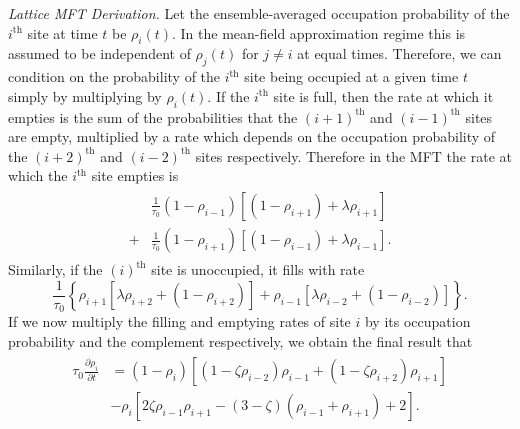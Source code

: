 \documentclass[
reprint,
 amsmath,amssymb,
 aps,
 prl,
]{revtex4-1}
\newcommand{\partDeriv}[2]{\frac{\partial #1}{\partial #2}}
\begin{document}
\textit{Lattice MFT Derivation.} Let the ensemble-averaged occupation probability of the $i^\mathrm{th}$ site at time $t$ be $\rho_i (t)$. In the mean-field approximation regime this is assumed to be independent of $\rho_j(t)$ for $j \neq i $ at
equal times. Therefore, we can condition on the probability of the $i^\mathrm{th}$ site being occupied at a given time $t$ simply by multiplying by $\rho_i (t)$.
If the $i^\mathrm{th}$ site is full, then the rate at which it empties is the sum of the probabilities that the $(i+1)^\mathrm{th}$ and $(i-1)^\mathrm{th}$ sites are empty, multiplied by a rate which depends on the occupation probability
of the $(i+2)^\mathrm{th}$ and $(i-2)^\mathrm{th}$ sites respectively. Therefore in the MFT the rate at which the $i^\mathrm{th}$ site empties is 
\begin{align}
\begin{split}
 &\frac{1}{\tau_0 } (1-\rho_{i-1})\left[ (1 - \rho_{i+1}) + \lambda \rho_{i+1} \right] \\
 +&\frac{1}{\tau_0 } (1-\rho_{i+1})\left[ (1 - \rho_{i-1}) + \lambda \rho_{i-1} \right] .
\end{split}
 \end{align}
Similarly, if the $(i)^\mathrm{th}$ site is unoccupied, it fills with rate
\begin{equation}
\frac{1}{\tau_0 } \left\{ \rho_{i+1} \left[ \lambda \rho_{i+2} + (1-\rho_{i+2}) \right] + \rho_{i-1} \left[ \lambda \rho_{i-2} + (1-\rho_{i-2}) \right] \right\}.
\end{equation}
If we now multiply the filling and emptying rates of site $i$ by its occupation probability and the complement respectively, we obtain the final result that
\begin{align}
\label{eq:latticeMFT}
\begin{split}
 \tau_0 \partDeriv{\rho_i}{t} &= \left( 1-\rho_i \right) \left[ \left(1-\zeta\rho_{i-2} \right) \rho_{i-1} + \left(1-\zeta\rho_{i+2} \right) \rho_{i+1} \right] \\
 &- \rho_i \left[ 2 \zeta \rho_{i-1} \rho_{i+1}  - (3-\zeta)\left(\rho_{i-1} + \rho_{i+1}\right) + 2 \right].
 \end{split}
 \end{align}
\end{document}
